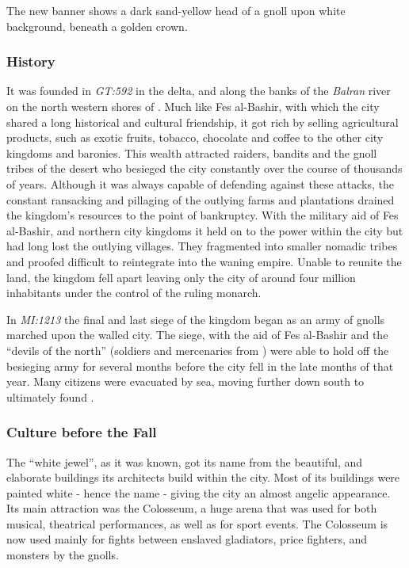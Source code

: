 The new banner shows a dark sand-yellow head of a gnoll upon white background,
beneath a golden crown.

\subsubsection{History}

It was founded in \emph{GT:592} in the delta, and along the banks of the
\emph{Balran} river on the north western shores of . Much
like Fes al-Bashir, with which the city shared a long historical and cultural
friendship, it got rich by selling agricultural products, such as exotic
fruits, tobacco, chocolate and coffee to the other city kingdoms and
baronies. This wealth attracted raiders, bandits and the gnoll tribes of the
desert who besieged the city constantly over the course of thousands of
years. Although it was always capable of defending against these attacks, the
constant ransacking and pillaging of the outlying farms and plantations
drained the kingdom's resources to the point of bankruptcy. With the military
aid of Fes al-Bashir, and northern city kingdoms it held on to the power within
the city but had long lost the outlying villages. They fragmented into smaller
nomadic tribes and proofed difficult to reintegrate into the waning
empire. Unable to reunite the land, the kingdom fell apart leaving only the
city of around four million inhabitants under the control of the ruling
monarch.

In \emph{MI:1213} the final and last siege of the kingdom began as an army of
gnolls marched upon the walled city. The siege, with the aid of Fes al-Bashir
and the ``devils of the north'' (soldiers and mercenaries from
) were able to hold off the besieging army for several
months before the city fell in the late months of that year. Many citizens
were evacuated by sea, moving further down south to ultimately found
.

\subsubsection{Culture before the Fall}

The ``white jewel'', as it was known, got its name from the beautiful, and
elaborate buildings its architects build within the city. Most of its
buildings were painted white - hence the name - giving the city an almost
angelic appearance. Its main attraction was the Colosseum, a huge arena
that was used for both musical, theatrical performances, as well as for
sport events. The Colosseum is now used mainly for fights between enslaved
gladiators, price fighters, and monsters by the gnolls.

